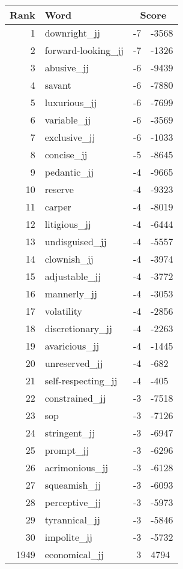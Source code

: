 \begin{longtable}[!htbp]{| rlr@{.}l |}
    \hline
    \textbf{Rank} & \textbf{Word} & \multicolumn{2}{c|}{\textbf{Score}} \\
    \hline
    \endhead
    1 & downright\_jj & -7 & -3568 \\
    2 & forward-looking\_jj & -7 & -1326 \\
    3 & abusive\_jj & -6 & -9439 \\
    4 & savant & -6 & -7880 \\
    5 & luxurious\_jj & -6 & -7699 \\
    6 & variable\_jj & -6 & -3569 \\
    7 & exclusive\_jj & -6 & -1033 \\
    8 & concise\_jj & -5 & -8645 \\
    9 & pedantic\_jj & -4 & -9665 \\
    10 & reserve & -4 & -9323 \\
    11 & carper & -4 & -8019 \\
    12 & litigious\_jj & -4 & -6444 \\
    13 & undisguised\_jj & -4 & -5557 \\
    14 & clownish\_jj & -4 & -3974 \\
    15 & adjustable\_jj & -4 & -3772 \\
    16 & mannerly\_jj & -4 & -3053 \\
    17 & volatility & -4 & -2856 \\
    18 & discretionary\_jj & -4 & -2263 \\
    19 & avaricious\_jj & -4 & -1445 \\
    20 & unreserved\_jj & -4 & -682 \\
    21 & self-respecting\_jj & -4 & -405 \\
    22 & constrained\_jj & -3 & -7518 \\
    23 & sop & -3 & -7126 \\
    24 & stringent\_jj & -3 & -6947 \\
    25 & prompt\_jj & -3 & -6296 \\
    26 & acrimonious\_jj & -3 & -6128 \\
    27 & squeamish\_jj & -3 & -6093 \\
    28 & perceptive\_jj & -3 & -5973 \\
    29 & tyrannical\_jj & -3 & -5846 \\
    30 & impolite\_jj & -3 & -5732 \\
    1949 & economical\_jj & 3 & 4794 \\

\end{longtable}
